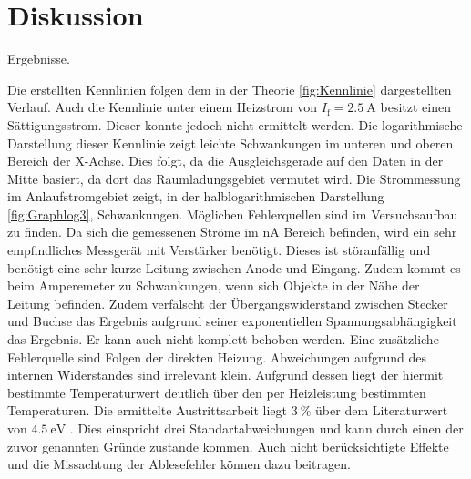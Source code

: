 
\section{Diskussion}
\label{sec:Diskussion}

 \begin{table}
 	\centering
 	\caption{Ergebnisse.}
 	
 \end{table}

Die erstellten Kennlinien folgen dem in der Theorie \ref{fig:Kennlinie} dargestellten Verlauf.
 Auch die Kennlinie unter einem Heizstrom von $I_\text{f} = \SI{2.5}{\ampere}$
 besitzt einen Sättigungsstrom. Dieser konnte jedoch nicht ermittelt werden.
Die logarithmische Darstellung dieser Kennlinie zeigt leichte Schwankungen im
unteren und oberen Bereich der X-Achse. Dies folgt, da die Ausgleichsgerade auf
den Daten in der Mitte basiert, da dort das Raumladungsgebiet vermutet wird.
Die Strommessung im Anlaufstromgebiet zeigt, in der halblogarithmischen
Darstellung \ref{fig:Graphlog3}, Schwankungen. Möglichen Fehlerquellen sind im
Versuchsaufbau zu finden. Da sich die gemessenen Ströme im $\si{\nano\ampere}$
Bereich befinden, wird ein sehr empfindliches Messgerät mit Verstärker benötigt.
Dieses ist störanfällig und benötigt eine sehr kurze Leitung zwischen Anode und Eingang.
Zudem kommt es beim Amperemeter zu Schwankungen, wenn sich Objekte in der Nähe der
Leitung befinden. Zudem verfälscht der Übergangswiderstand zwischen Stecker und
Buchse das Ergebnis aufgrund seiner exponentiellen Spannungsabhängigkeit das Ergebnis.
 Er kann auch nicht komplett behoben werden. Eine zusätzliche Fehlerquelle sind
 Folgen der direkten Heizung. Abweichungen aufgrund des internen Widerstandes
 sind irrelevant klein. Aufgrund dessen liegt der hiermit bestimmte Temperaturwert
 deutlich über den per Heizleistung bestimmten Temperaturen. Die ermittelte
 Austrittsarbeit liegt $\SI{3}{\percent}$ über dem Literaturwert von $\SI{4.5}{\electronvolt}$ \cite{wolfaus}. Dies einspricht drei Standartabweichungen und kann durch einen der zuvor genannten Gründe zustande kommen. Auch nicht berücksichtigte Effekte und die Missachtung der Ablesefehler können dazu beitragen.
